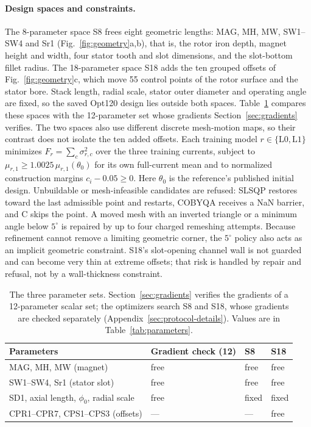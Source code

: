 \paragraph{Design spaces and constraints.}
The 8-parameter space S8 frees eight geometric lengths: MAG, MH, MW,
SW1--SW4 and Sr1 (Fig.~\ref{fig:geometry}a,b), that is, the rotor iron
depth, magnet height and width, four stator tooth and slot dimensions, and
the slot-bottom fillet radius. The 18-parameter space S18 adds the ten
grouped offsets of Fig.~\ref{fig:geometry}c, which move 55 control points
of the rotor surface and the stator bore. Stack length, radial scale,
stator outer diameter and operating angle are fixed, so the saved Opt120
design lies outside both spaces. Table~\ref{tab:paramsets} compares these
spaces with the 12-parameter set whose gradients Section~\ref{sec:gradients}
verifies. The two spaces also use different discrete mesh-motion maps, so
their contrast does not isolate the ten added offsets.
Each training model $r\in\{\mathrm{L0},\mathrm{L1}\}$ minimizes
$F_r=\sum_c\sigma_{r,c}^2$ over the three training currents, subject to
$\mu_{r,1}\geq1.0025\,\mu_{r,1}(\theta_0)$ for its own full-current mean and to
normalized construction margins $c_i-0.05\geq0$. Here $\theta_0$ is the
reference's published initial design. Unbuildable or
mesh-infeasible candidates are refused: SLSQP restores toward the last
admissible point and restarts, COBYQA receives a NaN barrier, and C skips
the point. A moved mesh with an inverted triangle or a minimum angle below
$5^\circ$ is repaired by up to four charged remeshing attempts. Because
refinement cannot remove a limiting geometric corner, the $5^\circ$ policy
also acts as an implicit geometric constraint. S18's slot-opening
channel wall is not guarded and can become very thin at extreme offsets;
that risk is handled by repair and refusal, not by a wall-thickness
constraint.

\begin{table}[H]\centering\small
\caption{The three parameter sets. Section~\ref{sec:gradients} verifies
the gradients of a 12-parameter scalar set; the optimizers search S8 and
S18, whose gradients are checked separately
(Appendix~\ref{sec:protocol-details}). Values are in
Table~\ref{tab:parameters}.}
\label{tab:paramsets}
\begin{tabular}{llll}\toprule
Parameters & Gradient check (12) & S8 & S18\\\midrule
MAG, MH, MW (magnet) & free & free & free\\
SW1--SW4, Sr1 (stator slot) & free & free & free\\
SD1, axial length, $\phi_0$, radial scale & free & fixed & fixed\\
CPR1--CPR7, CPS1--CPS3 (offsets) & --- & --- & free\\\bottomrule
\end{tabular}
\end{table}


